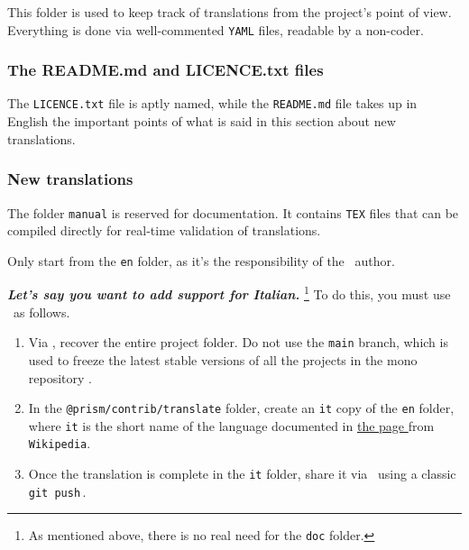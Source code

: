 \documentclass{tutodoc}
\begin{document}
This folder is used to keep track of translations from the project's point of view. Everything is done via well-commented \verb#YAML# files, readable by a non-coder.




\subsubsection{The README.md and LICENCE.txt files}

The \texttt{LICENCE.txt} file is aptly named, while the \texttt{README.md} file takes up in English the important points of what is said in this section about new translations.




\subsubsection{New translations}
\label{tutodoc-contrib-translate}

\begin{tdocnote}
    The folder \verb#manual# is reserved for documentation. It contains \verb#TEX# files that can be compiled directly for real-time validation of translations.
\end{tdocnote}


\begin{tdocwarn}
    Only start from the \verb#en# folder, as it's the responsibility of the \thisproj\ author.
\end{tdocwarn}


\medskip


\emph{\textbf{Let's say you want to add support for Italian.}}%
\footnote{
    As mentioned above, there is no real need for the \texttt{doc} folder.
}
To do this, you must use \git\ as follows.
%
\begin{enumerate}
    \item Via \thisrepo, recover the entire project folder.
    Do not use the \verb#main# branch, which is used to freeze the latest stable versions of all the projects in the mono repository \thismonorepo.

    \item In the \verb#@prism/contrib/translate# folder, create an \verb#it# copy of the \verb#en# folder, where \verb#it# is the short name of the language documented in
    \href{https://en.wikipedia.org/wiki/IETF_language_tag#List_of_common_primary_language_subtags}%
         {the page }
    from \texttt{Wikipedia}.

    \item Once the translation is complete in the \verb#it# folder, share it via \thisrepo\ using a classic \verb#git push#\,.
\end{enumerate}
\end{document}
